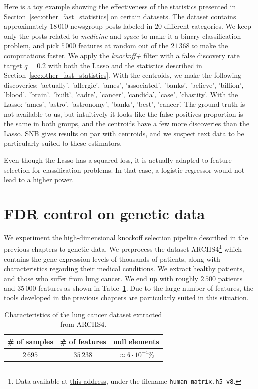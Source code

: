 Here is a toy example showing the effectiveness of the statistics presented in Section~\ref{sec:other_fast_statistics}
on certain datasets.
The  dataset contains approximately $18\,000$ newsgroup posts labeled in $20$ different categories.
We keep only the posts related to \emph{medicine} and \emph{space} to make it a binary classification problem,
and pick $5\,000$ features at random out of the $21\,368$ to make the computations faster.
We apply the \emph{knockoff+} filter with a false discovery rate target $q = 0.2$
with both the Lasso and the statistics described in Section~\ref{sec:other_fast_statistics}.
With the centroids, we make the following discoveries:
'actually', 'allergic', 'ames', 'associated', 'banks', 'believe',
'billion', 'blood', 'brain', 'built', 'cadre', 'cancer', 'candida',
'case', 'chastity'.
With the Lasso: 'ames', 'astro', 'astronomy', 'banks', 'best', 'cancer'.
The ground truth is not available to us,
but intuitively it looks like the false positives proportion is the same in both groups,
and the centroids have a few more discoveries than the Lasso.
SNB gives results on par with centroids,
and we suspect text data to be particularly suited to these estimators.
\begin{remark}
    Even though the Lasso has a squared loss,
    it is actually adapted to feature selection for classification problems.
    In that case, a logistic regressor would not lead to a higher power.
\end{remark}

\section{FDR control on genetic data}\label{sec:genetic_data}

We experiment the high-dimensional knockoff selection pipeline
described in the previous chapters to genetic data.
We preprocess the dataset ARCHS4\footnote{
    Data available at \href{https://amp.pharm.mssm.edu/archs4/download.html}{this address},
    under the filename \texttt{human\_matrix.h5 v8}.
}
which contains the gene expression levels of thousands of patients,
along with characteristics regarding their medical conditions.
We extract healthy patients,
and those who suffer from lung cancer.
We end up with roughly $2\,500$ patients and $35\,000$ features as shown in Table~\ref{tab:archs4_dataset}.
Due to the large number of features,
the tools developed in the previous chapters are particularly suited in this situation.
\begin{table}[!htb]
    \centering
    \setlength{\tabcolsep}{2pt}
    {\small
        \begin{tabular}{|c|c|c|}\hline
        \textbf{\# of samples} & \textbf{\# of features} & \textbf{null elements}\\ \hline
        $2\,695$ & $35\,238$ & $\approx 6 \cdot 10^{-4}\%$\\ \hline
        \end{tabular}
    }%
    \caption[short]{
        Characteristics of the lung cancer dataset extracted from ARCHS4.
    }
    \label{tab:archs4_dataset}
\end{table}

